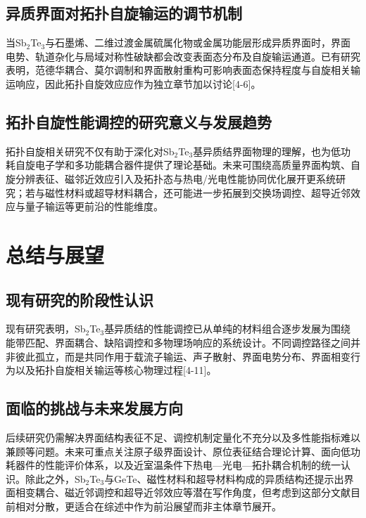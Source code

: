 \documentclass[12pt,a4paper]{ctexart}
\begin{document}
\subsection{异质界面对拓扑自旋输运的调节机制}
当Sb$_2$Te$_3$与石墨烯、二维过渡金属硫属化物或金属功能层形成异质界面时，界面电势、轨道杂化与局域对称性破缺都会改变表面态分布及自旋输运通道。已有研究表明，范德华耦合、莫尔调制和界面散射重构可影响表面态保持程度与自旋相关输运响应，因此拓扑自旋效应应作为独立章节加以讨论[4-6]。

\subsection{拓扑自旋性能调控的研究意义与发展趋势}
拓扑自旋相关研究不仅有助于深化对Sb$_2$Te$_3$基异质结界面物理的理解，也为低功耗自旋电子学和多功能耦合器件提供了理论基础。未来可围绕高质量界面构筑、自旋分辨表征、磁邻近效应引入及拓扑态与热电/光电性能协同优化展开更系统研究；若与磁性材料或超导材料耦合，还可能进一步拓展到交换场调控、超导近邻效应与量子输运等更前沿的性能维度。

\section{总结与展望}

\subsection{现有研究的阶段性认识}
现有研究表明，Sb$_2$Te$_3$基异质结的性能调控已从单纯的材料组合逐步发展为围绕能带匹配、界面耦合、缺陷调控和多物理场响应的系统设计。不同调控路径之间并非彼此孤立，而是共同作用于载流子输运、声子散射、界面电势分布、界面相变行为以及拓扑自旋相关输运等核心物理过程[4-11]。

\subsection{面临的挑战与未来发展方向}
后续研究仍需解决界面结构表征不足、调控机制定量化不充分以及多性能指标难以兼顾等问题。未来可重点关注原子级界面设计、原位表征结合理论计算、面向低功耗器件的性能评价体系，以及近室温条件下热电—光电—拓扑耦合机制的统一认识。除此之外，Sb$_2$Te$_3$与GeTe、磁性材料和超导材料构成的异质结构还提示出界面相变耦合、磁近邻调控和超导近邻效应等潜在写作角度，但考虑到这部分文献目前相对分散，更适合在综述中作为前沿展望而非主体章节展开。
\end{document}
